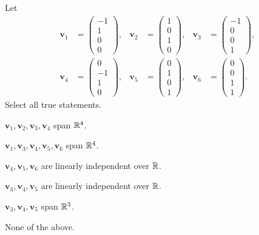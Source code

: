 \documentclass[11pt,oneside]{article}
\begin{document}
\begin{problem}
Let
\[
\begin{aligned}
\mathbf v_1&=\begin{pmatrix}-1\\1\\0\\0\end{pmatrix},&
\mathbf v_2&=\begin{pmatrix}1\\0\\1\\0\end{pmatrix},&
\mathbf v_3&=\begin{pmatrix}-1\\0\\0\\1\end{pmatrix},\\[0.4em]
\mathbf v_4&=\begin{pmatrix}0\\-1\\1\\0\end{pmatrix},&
\mathbf v_5&=\begin{pmatrix}0\\1\\0\\1\end{pmatrix},&
\mathbf v_6&=\begin{pmatrix}0\\0\\1\\1\end{pmatrix}.
\end{aligned}
\]
Select all true statements.
\begin{problemchoices}
\item $\mathbf v_1,\mathbf v_2,\mathbf v_3,\mathbf v_4$ span $\mathbb{R}^4$.
\item $\mathbf v_1,\mathbf v_3,\mathbf v_4,\mathbf v_5,\mathbf v_6$ span $\mathbb{R}^4$.
\item $\mathbf v_4,\mathbf v_5,\mathbf v_6$ are linearly independent over $\mathbb{R}$.
\item $\mathbf v_3,\mathbf v_4,\mathbf v_5$ are linearly independent over $\mathbb{R}$.
\item $\mathbf v_3,\mathbf v_4,\mathbf v_5$ span $\mathbb{R}^3$.
\item None of the above.
\end{problemchoices}
\end{problem}
\end{document}
